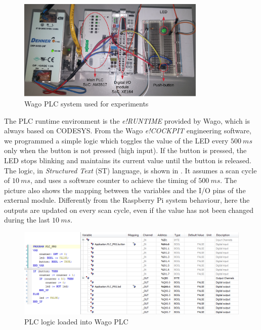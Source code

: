 \begin{figure}[h]
\centerline{\includegraphics[width=0.8\textwidth]{res/plc_system}}
\caption{Wago PLC system used for experiments \label{fig:plc_system}}
\end{figure}

The PLC runtime environment is the \emph{e!RUNTIME} provided by Wago, which is always based on CODESYS. From the Wago \emph{e!COCKPIT} engineering software,
we programmed a simple logic which toggles the value of the LED every $\SI{500}{ms}$ only when the button is not pressed (high input). If the button is pressed,
the LED stops blinking and maintains its current value until the button is released. The logic, in \emph{Structured Text} (ST) language, is shown in .
It assumes a scan cycle of $\SI{10}{ms}$, and uses a software counter to achieve the timing of $\SI{500}{ms}$. The picture also shows the mapping between the variables
and the I/O pins of the external module. Differently from the Raspberry Pi system behaviour, here the outputs are updated on every scan cycle, even if the value has not been changed
during the last $\SI{10}{ms}$.
\begin{figure}[h]
\centerline{\includegraphics[width=\textwidth]{res/plc_logic}}
\caption{PLC logic loaded into Wago PLC \label{fig:plc_logic}}
\end{figure}

